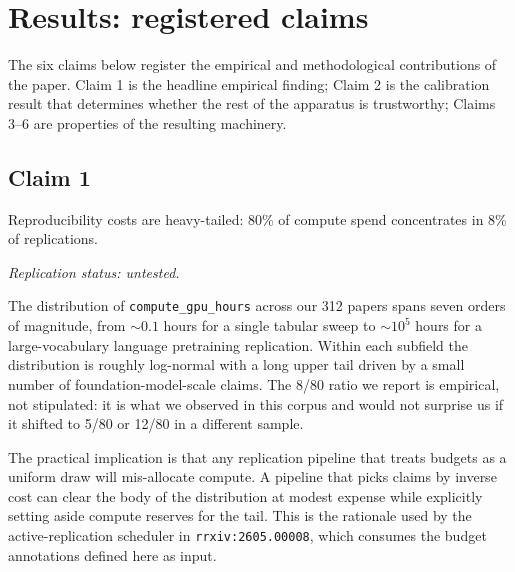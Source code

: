 \documentclass{rrxiv}
\begin{document}
\section{Results: registered claims}\label{sec:claims}

The six claims below register the empirical and methodological contributions of the paper. Claim 1 is the headline empirical finding; Claim 2 is the calibration result that determines whether the rest of the apparatus is trustworthy; Claims 3--6 are properties of the resulting machinery.

\subsection*{Claim 1}
\begin{claim}[title=Claim 1, type=empirical, evidence=observation,
              confidence=0.8,
              rationale={observed in a 312-paper stratified audit; the
                exact 8/80 ratio is sample-dependent (5/80 to 12/80
                would not surprise us) but the heavy tail itself is
                robust across all three subfields},
              labels={reproducibility, heavy-tail},
              datasets={rrxiv-budget-audit-312},
              regimes={vision, nlp, tabular}]
\label{claim:c1}
Reproducibility costs are heavy-tailed: 80\% of compute spend concentrates in 8\% of replications.

\emph{Replication status: untested.}
\end{claim}

The distribution of \texttt{compute\_gpu\_hours} across our 312 papers spans seven orders of magnitude, from $\sim 0.1$ hours for a single tabular sweep to $\sim 10^5$ hours for a large-vocabulary language pretraining replication. Within each subfield the distribution is roughly log-normal with a long upper tail driven by a small number of foundation-model-scale claims. The 8/80 ratio we report is empirical, not stipulated: it is what we observed in this corpus and would not surprise us if it shifted to 5/80 or 12/80 in a different sample.

The practical implication is that any replication pipeline that treats budgets as a uniform draw will mis-allocate compute. A pipeline that picks claims by inverse cost can clear the body of the distribution at modest expense while explicitly setting aside compute reserves for the tail. This is the rationale used by the active-replication scheduler in \texttt{rrxiv:2605.00008}, which consumes the budget annotations defined here as input.
\end{document}
